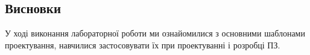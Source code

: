 \documentclass[oneside,14pt]{extarticle}
\begin{document}
\begin{normalsize}
	\section*{Висновки}
	У ході виконання лабораторної роботи ми ознайомилися з основними шаблонами проектування, навчилися застосовувати їх при проектуванні і розробці ПЗ.

	    
\end{normalsize}
\end{document}
